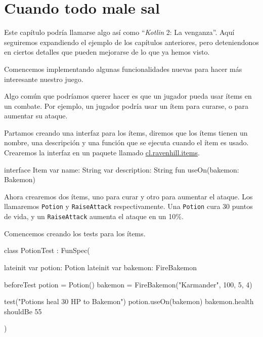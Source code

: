 \chapter{Cuando todo male sal}
  Este capítulo podría llamarse algo así como \enquote{\textit{Kotlin} 2: La venganza}.
  Aquí seguiremos expandiendo el ejemplo de los capítulos anteriores, pero deteniendonos en ciertos
  detalles que pueden mejorarse de lo que ya hemos visto.

  Comencemos implementando algunas funcionalidades nuevas para hacer más interesante nuestro juego.

  Algo común que podríamos querer hacer es que un jugador pueda usar ítems en un combate.
  Por ejemplo, un jugador podría usar un ítem para curarse, o para aumentar su ataque.

  Partamos creando una interfaz para los ítems, diremos que los ítems tienen un nombre, una 
  descripción y una función que se ejecuta cuando el ítem es usado.
  Crearemos la interfaz en un paquete llamado \url{cl.ravenhill.items}.

  \begin{kotlin}
    interface Item {
      var name: String
      var description: String
      fun useOn(bakemon: Bakemon)
    }
  \end{kotlin}

  Ahora crearemos dos ítems, uno para curar y otro para aumentar el ataque.
  Los llamaremos \texttt{Potion} y \texttt{RaiseAttack} respectivamente.
  Una \texttt{Potion} cura 30 puntos de vida, y un \texttt{RaiseAttack} aumenta el ataque en un 
  10\%.

  Comencemos creando los tests para los ítems.

  \begin{kotlin}
    class PotionTest : FunSpec({
      lateinit var potion: Potion
      lateinit var bakemon: FireBakemon

      beforeTest {
        potion = Potion()
        bakemon = FireBakemon("Karmander", 100, 5, 4)
      }
      
      test("Potions heal 30 HP to Bakemon") {
        potion.useOn(bakemon)
        bakemon.health shouldBe 55
      }
    })
  \end{kotlin}


